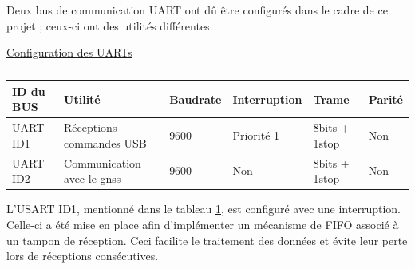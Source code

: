 Deux bus de communication UART ont dû être configurés dans le cadre de ce projet ; ceux-ci ont des utilités différentes.

\begin{center}
	\underline{Configuration des UARTs}
	\begin{table}[h]
		\centering
		\begin{tabular}{llllll}
			ID du BUS & Utilité & Baudrate & Interruption & Trame & Parité \\ 
			\hline
			UART ID1 & Réceptions commandes USB & 9600 & Priorité 1 & 8bits + 1stop & Non \\
			UART ID2 & Communication avec le \gls{gnss} & 9600 & Non & 8bits + 1stop & Non \\
		\end{tabular}
		\caption{}
		\label{tab:Usarts}
	\end{table}
\end{center}

L'USART ID1, mentionné dans le tableau \ref{tab:Usarts}, est configuré avec une interruption. Celle-ci a été mise en place afin d'implémenter un mécanisme de FIFO associé à un tampon de réception. Ceci facilite le traitement des données et évite leur perte lors de réceptions consécutives.


